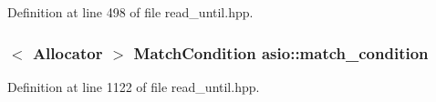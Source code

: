 Definition at line 498 of file read\+\_\+until.\+hpp.

\hypertarget{group__async__read__until_ga950b81fb954e4a0f01e13a57e15721b4}{}
\subsubsection[{match\+\_\+condition}]{$<$ Allocator $>$ Match\+Condition asio\+::match\+\_\+condition}\label{group__async__read__until_ga950b81fb954e4a0f01e13a57e15721b4}


Definition at line 1122 of file read\+\_\+until.\+hpp.

